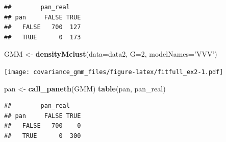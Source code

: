 \documentclass[]{article}
\newenvironment{Shaded}{\begin{snugshade}}{\end{snugshade}}
\newcommand{\DataTypeTok}[1]{\textcolor[rgb]{0.13,0.29,0.53}{#1}}
\newcommand{\DecValTok}[1]{\textcolor[rgb]{0.00,0.00,0.81}{#1}}
\newcommand{\KeywordTok}[1]{\textcolor[rgb]{0.13,0.29,0.53}{\textbf{#1}}}
\newcommand{\NormalTok}[1]{#1}
\newcommand{\StringTok}[1]{\textcolor[rgb]{0.31,0.60,0.02}{#1}}
\begin{document}
\begin{verbatim}
##        pan_real
## pan     FALSE TRUE
##   FALSE   700  127
##   TRUE      0  173
\end{verbatim}

\begin{Shaded}
\begin{Highlighting}[]
\NormalTok{GMM <-}\StringTok{ }\KeywordTok{densityMclust}\NormalTok{(}\DataTypeTok{data=}\NormalTok{data2, }\DataTypeTok{G=}\DecValTok{2}\NormalTok{, }\DataTypeTok{modelNames=}\StringTok{'VVV'}\NormalTok{)}
\end{Highlighting}
\end{Shaded}

\texttt{[image: covariance\_gmm\_files/figure-latex/fitfull\_ex2-1.pdf]}

\begin{Shaded}
\begin{Highlighting}[]
\NormalTok{pan <-}\StringTok{ }\KeywordTok{call_paneth}\NormalTok{(GMM)}
\KeywordTok{table}\NormalTok{(pan, pan_real)}
\end{Highlighting}
\end{Shaded}

\begin{verbatim}
##        pan_real
## pan     FALSE TRUE
##   FALSE   700    0
##   TRUE      0  300
\end{verbatim}
\end{document}

